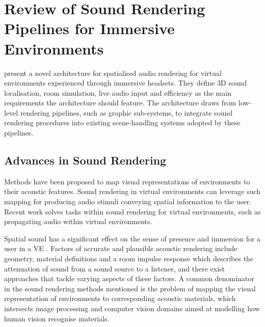 \section{Review of Sound Rendering Pipelines for Immersive Environments}\label{sec:lr-visual-acoustic-mapping}
\cite{naef2002spatialized} present a novel architecture for spatialised audio rendering for virtual environments experienced through immersive headsets. They define 3D sound localisation, room simulation, live audio input and efficiency as the main requirements the architecture should feature. The architecture draws from low-level rendering pipelines, such as graphic sub-systems, to integrate sound rendering procedures into existing scene-handling systems adopted by these pipelines. 

\subsection{Advances in Sound Rendering}
Methods have been proposed to map visual representations of environments to their acoustic features. Sound rendering in virtual environments can leverage such mapping for producing audio stimuli conveying spatial information to the user. Recent work solves tasks within sound rendering for virtual environments, such as propagating audio within virtual environments.\par
Spatial sound has a significant effect on the sense of presence and immersion for a user in a VE \citep{poeschl13}. Factors of accurate and plausible acoustic rendering include geometry, material definitions and a room impulse response which describes the attenuation of sound from a sound source to a listener, and there exist approaches that tackle varying aspects of these factors. A common denominator in the sound rendering methods mentioned is the problem of mapping the visual representation of environments to corresponding acoustic materials, which intersects image processing and computer vision domains aimed at modelling how human vision recognise materials.\par%

